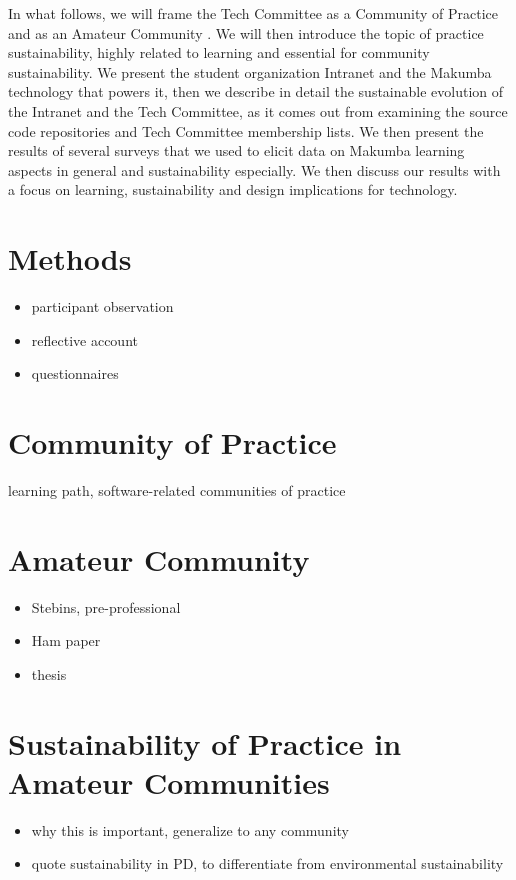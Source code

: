 \documentclass{acm_proc_article-sp}
\begin{document}
In what follows, we will frame the Tech Committee as a Community of Practice \cite{lave_wenger91, wenger98} and as an Amateur Community \cite{bogdan03, bogdan_bowers07}. We will then introduce the topic of practice sustainability, highly related to learning and essential for community sustainability. We present the student organization Intranet and the Makumba technology that powers it, then we describe in detail the sustainable evolution of the Intranet and the Tech Committee, as it comes out from examining the source code repositories and Tech Committee membership lists. We then present the results of several surveys 
that we used to elicit data on Makumba learning aspects in general and sustainability especially. We then discuss our results with a focus on learning, sustainability and design implications for technology.


\section{Methods}\label{sec:method}
\begin{itemize}
\item participant observation
\item reflective account
\item questionnaires
\end{itemize}

\section{Community of Practice}\label{sec:cop}
learning path, software-related communities of practice

\section{Amateur Community}\label{sec:amateur}
\begin{itemize}
\item Stebins, pre-professional
\item Ham paper
\item thesis
\end{itemize}

\section{Sustainability of Practice in Amateur Communities}\label{sec:sust}
\begin{itemize}
\item why this is important, generalize to any community
\item quote sustainability in PD, to differentiate from environmental sustainability
\end{itemize}
\end{document}

